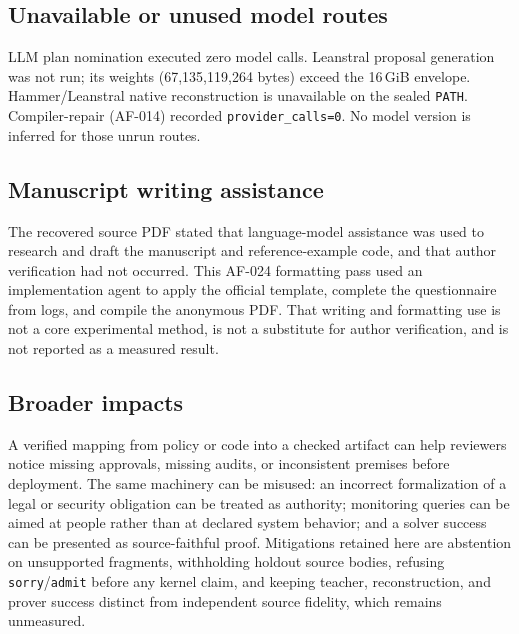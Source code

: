 \subsection{Unavailable or unused model routes}
\label{app:llm-unavailable}
LLM plan nomination executed zero model calls. Leanstral proposal generation
was not run; its weights (67{,}135{,}119{,}264 bytes) exceed the 16\,GiB
envelope. Hammer/Leanstral native reconstruction is unavailable on the sealed
\texttt{PATH}. Compiler-repair (AF-014) recorded
\texttt{provider\_calls=0}. No model version is inferred for those unrun
routes.

\subsection{Manuscript writing assistance}
\label{app:llm-writing}
The recovered source PDF stated that language-model assistance was used to
research and draft the manuscript and reference-example code, and that author
verification had not occurred. This AF-024 formatting pass used an
implementation agent to apply the official template, complete the
questionnaire from logs, and compile the anonymous PDF. That writing and
formatting use is not a core experimental method, is not a substitute for
author verification, and is not reported as a measured result.

\subsection{Broader impacts}
\label{app:impacts}
A verified mapping from policy or code into a checked artifact can help
reviewers notice missing approvals, missing audits, or inconsistent premises
before deployment. The same machinery can be misused: an incorrect
formalization of a legal or security obligation can be treated as authority;
monitoring queries can be aimed at people rather than at declared system
behavior; and a solver success can be presented as source-faithful proof.
Mitigations retained here are abstention on unsupported fragments, withholding
holdout source bodies, refusing \texttt{sorry}/\texttt{admit} before any
kernel claim, and keeping teacher, reconstruction, and prover success distinct
from independent source fidelity, which remains unmeasured.


